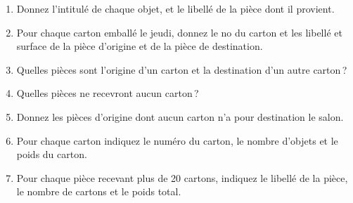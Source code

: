 \begin{enumerate}
  \item Donnez l'intitulé de chaque objet, et le libellé de la pièce
    dont il provient.

  \item Pour chaque carton emballé le jeudi, donnez le no du carton et les libellé et surface
      de la pièce d'origine et de la pièce de destination.
  \item Quelles pièces sont l'origine d'un carton et la destination d'un autre carton\,?
  \item Quelles pièces ne recevront aucun carton\,?
  \item Donnez les pièces d'origine dont aucun carton n'a pour destination le salon.
  \item Pour chaque carton indiquez le numéro du carton, le nombre d'objets et le poids du carton.
  \item Pour chaque pièce recevant plus de 20 cartons, indiquez le libellé de la pièce, le
    nombre de cartons et le poids total.
  \end{enumerate}


